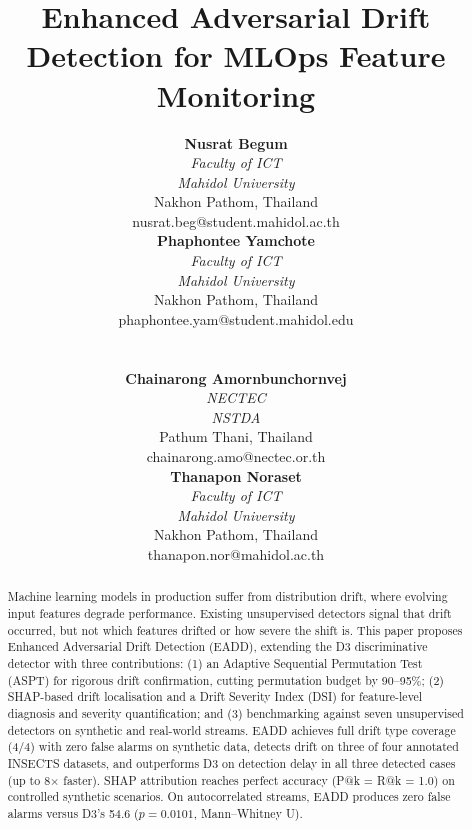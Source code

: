 \documentclass[conference,a4paper]{IEEEtran}
\begin{document}
\title{Enhanced Adversarial Drift Detection for MLOps Feature Monitoring}

\author{%
\hspace{-1em}%
\parbox[t]{0.5\textwidth}{\centering%
\textbf{Nusrat Begum}\\
\textit{Faculty of ICT}\\
\textit{Mahidol University}\\
Nakhon Pathom, Thailand\\
nusrat.beg@student.mahidol.ac.th}%
\parbox[t]{0.5\textwidth}{\centering%
\textbf{Phaphontee Yamchote}\\
\textit{Faculty of ICT}\\
\textit{Mahidol University}\\
Nakhon Pathom, Thailand\\
phaphontee.yam@student.mahidol.edu}%
\\[2.5ex]
\parbox[t]{0.5\textwidth}{\centering%
\textbf{Chainarong Amornbunchornvej}\\
\textit{NECTEC}\\
\textit{NSTDA}\\
Pathum Thani, Thailand\\
chainarong.amo@nectec.or.th}%
\parbox[t]{0.5\textwidth}{\centering%
\textbf{Thanapon Noraset}\\
\textit{Faculty of ICT}\\
\textit{Mahidol University}\\
Nakhon Pathom, Thailand\\
thanapon.nor@mahidol.ac.th}%
}

\maketitle

\begin{abstract}
Machine learning models in production suffer from distribution drift, where evolving input features degrade performance. Existing unsupervised detectors signal that drift occurred, but not which features drifted or how severe the shift is. This paper proposes Enhanced Adversarial Drift Detection (EADD), extending the D3 discriminative detector with three contributions: (1) an Adaptive Sequential Permutation Test (ASPT) for rigorous drift confirmation, cutting permutation budget by 90--95\%; (2) SHAP-based drift localisation and a Drift Severity Index (DSI) for feature-level diagnosis and severity quantification; and (3) benchmarking against seven unsupervised detectors on synthetic and real-world streams. EADD achieves full drift type coverage (4/4) with zero false alarms on synthetic data, detects drift on three of four annotated INSECTS datasets, and outperforms D3 on detection delay in all three detected cases (up to 8$\times$ faster). SHAP attribution reaches perfect accuracy (P@k = R@k = 1.0) on controlled synthetic scenarios. On autocorrelated streams, EADD produces zero false alarms versus D3's 54.6 ($p = 0.0101$, Mann--Whitney U).
\end{abstract}
\end{document}
